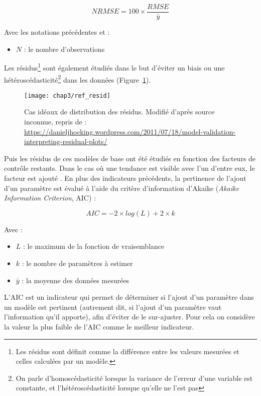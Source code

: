 $$ NRMSE = 100 \times \frac{RMSE}{\bar{y}} $$

Avec les notations précédentes et : 
\begin{itemize}
\item $N$ : le nombre d'observations
\end{itemize}
Les résidus\footnote{Les résidus sont définit comme la différence entre les valeurs mesurées et celles calculées par un modèle.} sont également étudiés dans le but d'éviter un biais ou une hétéroscédasticité\footnote{On parle d'homoscédasticité lorsque la variance de l'erreur d'une variable est constante, et l'hétéroscédasticité lorsque qu'elle ne l'est pas} dans les données (Figure~\ref{fig:ref_resid}).

\begin{figure}[!htb]
\centering
\texttt{[image: chap3/ref\_resid]}
\caption{Cas idéaux de distribution des résidus. Modifié d'après source inconnue, repris de : \url{https://danieljhocking.wordpress.com/2011/07/18/model-validation-interpreting-residual-plots/}}
\label{fig:ref_resid}
\end{figure}

Puis les résidus de ces modèles de base ont été étudiés en fonction des facteurs de contrôle restants.
Dans le cas où une tendance est visible avec l'un d'entre eux, le facteur est ajouté \citep{bortoluzzi2006a}.
En plus des indicateurs précédents, la pertinence de l'ajout d'un paramètre est évalué à l'aide du  critère d'information d'Akaike (\textit{Akaike Information Criterion}, AIC) \citep{akaike1974,burnham2002} :

$$ AIC = -2 \times log(L) + 2\times k $$ 

Avec :
\begin{itemize}
\item $L$ : le maximum de la fonction de vraisemblance
\item $k$ : le nombre de paramètres à estimer
\item $\bar{y}$ : la moyenne des données mesurées
\end{itemize}

L'AIC est un indicateur qui permet de déterminer si l'ajout d'un paramètre dans un modèle est pertinent (autrement dit, si l'ajout d'un paramètre vaut l'information qu'il apporte), afin d'éviter de le sur-ajuster.
Pour cela on considère la valeur la plus faible de l'AIC comme le meilleur indicateur.

